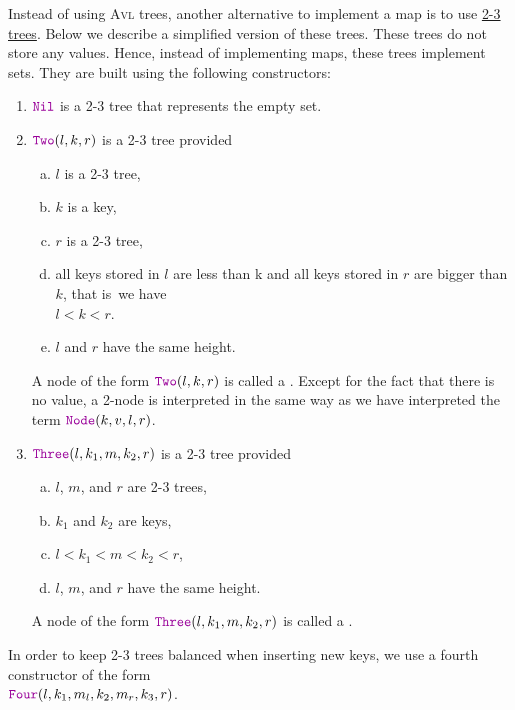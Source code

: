\exercise
Instead of using \textsc{Avl} trees, another alternative to implement a map is to use 
\href{https://en.wikipedia.org/wiki/2-3_tree}{2-3 trees}.  
Below we describe a simplified version of these trees.  These trees do not store any values.  Hence, instead
of implementing maps, these trees implement sets. They are built using the following constructors:
\begin{enumerate}
\item $\mytt{Nil}$ is a 2-3 tree that represents the empty set.
\item $\mytt{Two}(l, k, r)$ is a 2-3 tree provided
      \begin{enumerate}[(a)]
      \item $l$ is a 2-3 tree,
      \item $k$ is a key,
      \item $r$ is a 2-3 tree,
      \item all keys stored in $l$ are less than k and all keys stored in $r$ are bigger than $k$,
            that is~we have
            \\[0.2cm]
            \hspace*{1.3cm}
            $l < k < r$.
      \item $l$ and $r$ have the same height.
      \end{enumerate}
      A node of the form  $\mytt{Two}(l, k, r)$ is called a .  Except for the fact
      that there is no value, a 2-node is
      interpreted in the same way as we have interpreted the term $\mytt{Node}(k, v, l, r)$.
\item $\mytt{Three}(l, k_1, m, k_2, r)$ is a 2-3 tree provided
      \begin{enumerate}[(a)]
      \item $l$, $m$, and $r$ are 2-3 trees,
      \item $k_1$ and $k_2$ are keys,
      \item $l < k_1 < m < k_2 < r$,
      \item $l$, $m$, and $r$ have the same height.
      \end{enumerate}
      A node of the form  $\mytt{Three}(l, k_1, m, k_2, r)$ is called a .
\end{enumerate}
In order to keep 2-3 trees balanced when inserting new keys, we use a fourth constructor of the form
\\[0.2cm]
\hspace*{1.3cm}
$\mytt{Four}(l,k_1,m_l, k_2, m_r, k_3, r)$.
\\[0.2cm]
